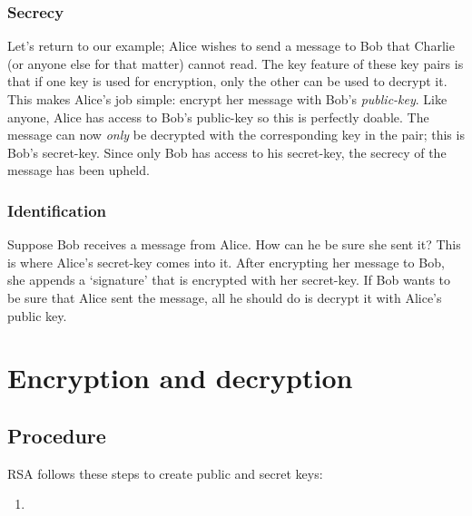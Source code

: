 \documentclass{amsart}
\begin{document}
\subsubsection[secrecy]{Secrecy}
Let's return to our example; Alice wishes to send a message to Bob that Charlie (or anyone else for that matter) cannot read. The key feature of these key pairs is that if one key is used for encryption, only the other can be used to decrypt it. This makes Alice's job simple: encrypt her message with Bob's \textit{public-key}. Like anyone, Alice has access to Bob's public-key so this is perfectly doable. The message can now \textit{only} be decrypted with the corresponding key in the pair; this is Bob's secret-key. Since only Bob has access to his secret-key, the secrecy of the message has been upheld.

\subsubsection[ident]{Identification}
Suppose Bob receives a message from Alice. How can he be sure she sent it? This is where Alice's secret-key comes into it. After encrypting her message to Bob, she appends a `signature' that is encrypted with her secret-key. If Bob wants to be sure that Alice sent the message, all he should do is decrypt it with Alice's public key.

\section[enc/dec]{Encryption and decryption}
\subsection[proc]{Procedure}
RSA follows these steps to create public and secret keys:
\begin{enumerate}
    \item 
\end{enumerate}
\end{document}
